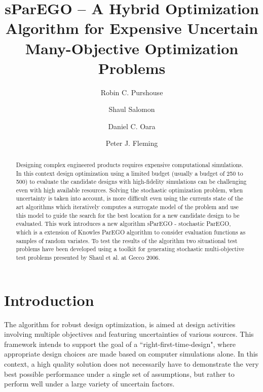 \documentclass[10pt]{llncs}
\begin{document}
\title{sParEGO -- A Hybrid Optimization Algorithm for Expensive Uncertain Many-Objective Optimization Problems}
\author{Robin C. Purshouse \and Shaul Salomon \and Daniel C. Oara \and Peter J. Fleming}

\maketitle

\begin{abstract}
Designing complex engineered products requires expensive computational simulations. In this context design optimization using a limited budget (usually a budget of 250 to 500) to evaluate the candidate designs with high-fidelity simulations can be challenging even with high available resources. Solving the stochastic optimization problem, when uncertainty is taken into account, is more difficult even using the currents state of the art algorithms which iteratively computes a surrogate model of the problem and use this model to guide the search for the best location for a new candidate design to be evaluated. This work introduces a new algorithm sParEGO - stochastic ParEGO, which is a extension of Knowles ParEGO algorithm \cite{Knowles2006ParEGO} to consider evaluation functions as samples of random variates. To test the results of the algorithm two situational test problems have been developed using a toolkit for generating stochastic multi-objective test problems presented by Shaul et al. at Gecco 2006.    

    
\end{abstract}

\section{\label{sec:intro}Introduction}
The algorithm for robust design optimization, is aimed at design activities involving
multiple objectives and featuring uncertainties of various sources. This framework intends to support the goal of a ``right-first-time-design", where appropriate design choices are made based on computer simulations alone. In this context, a high quality solution does not necessarily have to demonstrate the very best possible performance under a single set of assumptions, but rather to perform well under a large variety of uncertain factors.
\end{document}
